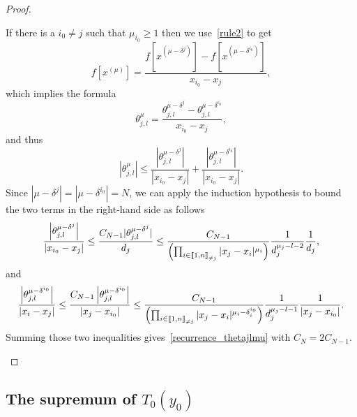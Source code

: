 \documentclass[10pt]{amsart}
\theoremstyle{definition}\newtheorem{defi}[theo]{Definition}\newtheorem{rema}[theo]{Remark}\newtheorem{exam}[theo]{Example}\newtheorem{exem}[theo]{Example}\newtheorem{nota}[theo]{Notation}
\newcommand{\llbracket}{\mathopen{[\mkern -2.7mu[}}
\newcommand{\rrbracket}{\mathclose{]\mkern -2.7mu]}}
\newcommand{\interexclu}[3]{\llbracket #1,#2\rrbracket_{\neq #3}}
\begin{document}
\begin{proof}
\begin{itemize}
\begin{itemize}
If there is a $i_0\neq j$ such that $\mu_{i_0}\geq 1$ then we use~\eqref{rule2} to get
\[
f\left[x^{(\mu)}\right] = \frac{f\left[x^{(\mu-\delta^j)}\right] - f\left[x^{(\mu-\delta^{i_0})}\right]}{x_{i_0}-x_j},
\]
which implies the formula
\[
\theta_{j,l}^{\mu} = \frac{\theta_{j,l}^{\mu-\delta^j} - \theta_{j,l}^{\mu-\delta^{i_0}}}{x_{i_0}-x_j},
\]
and thus
\[
\left|\theta_{j,l}^{\mu}\right|\leq \frac{\left|\theta_{j,l}^{\mu-\delta^j}\right|}{\left|x_{i_0}-x_j\right|} + \frac{\left|\theta_{j,l}^{\mu-\delta^{i_0}}\right|}{\left|x_{i_0}-x_j\right|}.
\]
Since $|\mu-\delta^j|=|\mu-\delta^{i_0}|=N$, we can apply the induction hypothesis to bound the two terms in the right-hand side as follows
\begin{equation*}
\frac{\left|\theta_{j,l}^{\mu-\delta^j}\right|}{\left|x_{i_0}-x_j\right|} \leq \frac{C_{N-1} |\theta_{j,l}^{\mu-\delta^j}|}{d_j} \leq \frac{C_{N-1}}{\left(\prod_{i\in\interexclu{1}{n}{j}} |x_j-x_i|^{\mu_i}\right)} \frac{1}{d_j^{\mu_j-l-2}} \frac{1}{d_j},
\end{equation*}
and
\begin{equation*}
\frac{\left|\theta_{j,l}^{\mu-\delta^{i_0}}\right|}{\left|x_i-x_j\right|} \leq \frac{C_{N-1} \left|\theta_{j,l}^{\mu-\delta^{i_0}}\right|}{\left|x_j-x_{i_0}\right|}
\leq \frac{C_{N-1}}{\left(\prod_{i\in\interexclu{1}{n}{j}} |x_j-x_i|^{\mu_i-\delta_i^{i_0}}\right)} \frac{1}{d_j^{\mu_j-l-1}} \frac{1}{|x_j-x_{i_0}|}.
\end{equation*}
Summing those two inequalities gives~\eqref{recurrence_thetajlmu} with $C_N=2C_{N-1}$.\qedhere
\end{itemize}
\end{itemize}
\end{proof}



\subsection{The supremum of \texorpdfstring{$T_0(y_0)$}{T0(F0)}} \label{Subsec:Sup_Tmin}
\end{document}
